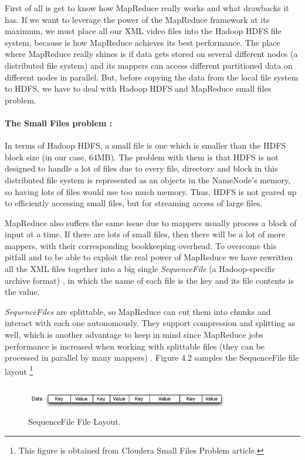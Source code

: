 First of all is get to know how MapReduce really works and what drawbacks it has. If we want to leverage the power of the MapReduce framework at its maximum, we must place all our XML video files into the Hadoop HDFS file system, because is how MapReduce achieves its best performance. The place where MapReduce really shines is if data gets stored on several different nodes (a distributed file system) and its mappers can access different partitioned data on different nodes in parallel. But, before copying the data from the local file system to HDFS, we have to deal with Hadoop HDFS and MapReduce small files problem.

\paragraph{The Small Files problem \cite{liu2009implementing}:} In terms of Hadoop HDFS, a small file is one which is smaller than the HDFS block size (in our case, 64MB). The problem with them is that HDFS is not designed to handle a lot of files due to every file, directory and block in this distributed file system is represented as an objects in the NameNode's memory, so having lots of files would use too much memory. Thus, HDFS is not geared up to efficiently accessing small files, but for streaming access of large files. 
\par
MapReduce also suffers the same issue due to mappers usually process a block of input at a time. If there are lots of small files, then there will be a lot of more mappers, with their corresponding bookkeeping overhead. To overcome this pitfall and to be able to exploit the real power of MapReduce we have rewritten all the XML files together into a big single \textit{SequenceFile} (a Hadoop-specific archive format) \cite{ApacheHadoopSequenceFile}, in which the name of each file is the key and its file contents is the value. 
\par
\textit{SequenceFiles} are splittable, so MapReduce can cut them into chunks and interact with each one autonomously. They support compression and splitting as well, which is another advantage to keep in mind since MapReduce jobs performance is increased when working with splittable files (they can be processed in parallel by many mappers)  \cite{SmallFiles}. Figure 4.2 samples the SequenceFile file layout \footnote{This figure is obtained from Cloudera Small Files Problem article.}

\begin{figure}[htb]
\centering
\includegraphics[width=0.8\textwidth]{./images/sequencefile.png}
\caption{SequenceFile File Layout.} \label{fig:sequencefile}
\end{figure}


